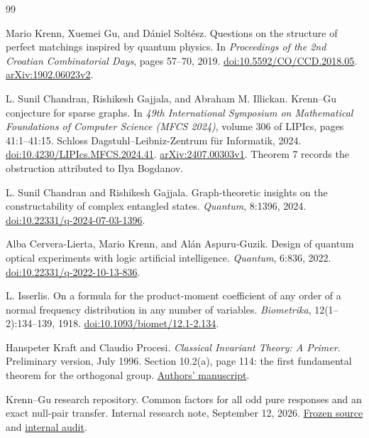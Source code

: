 \documentclass[11pt]{article}
\theoremstyle{definition}
\theoremstyle{plain}
\numberwithin{equation}{section}
\begin{document}
\begingroup
\small
\raggedright
\begin{thebibliography}{99}

Mario Krenn, Xuemei Gu, and D\'aniel Solt\'esz.
Questions on the structure of perfect matchings inspired by quantum physics.
In \emph{Proceedings of the 2nd Croatian Combinatorial Days}, pages 57--70, 2019.
\href{https://doi.org/10.5592/CO/CCD.2018.05}{doi:10.5592/CO/CCD.2018.05}.
\href{https://arxiv.org/abs/1902.06023v2}{arXiv:1902.06023v2}.

L. Sunil Chandran, Rishikesh Gajjala, and Abraham M. Illickan.
Krenn--Gu conjecture for sparse graphs.
In \emph{49th International Symposium on Mathematical Foundations of Computer
Science (MFCS 2024)}, volume 306 of LIPIcs, pages 41:1--41:15.
Schloss Dagstuhl--Leibniz-Zentrum f\"ur Informatik, 2024.
\href{https://doi.org/10.4230/LIPIcs.MFCS.2024.41}{doi:10.4230/LIPIcs.MFCS.2024.41}.
\href{https://arxiv.org/abs/2407.00303v1}{arXiv:2407.00303v1}.
Theorem 7 records the obstruction attributed to Ilya Bogdanov.

L. Sunil Chandran and Rishikesh Gajjala.
Graph-theoretic insights on the constructability of complex entangled states.
\emph{Quantum}, 8:1396, 2024.
\href{https://doi.org/10.22331/q-2024-07-03-1396}{doi:10.22331/q-2024-07-03-1396}.

Alba Cervera-Lierta, Mario Krenn, and Al\'an Aspuru-Guzik.
Design of quantum optical experiments with logic artificial intelligence.
\emph{Quantum}, 6:836, 2022.
\href{https://doi.org/10.22331/q-2022-10-13-836}{doi:10.22331/q-2022-10-13-836}.

L. Isserlis.
On a formula for the product-moment coefficient of any order of a normal
frequency distribution in any number of variables.
\emph{Biometrika}, 12(1--2):134--139, 1918.
\href{https://doi.org/10.1093/biomet/12.1-2.134}{doi:10.1093/biomet/12.1-2.134}.

Hanspeter Kraft and Claudio Procesi.
\emph{Classical Invariant Theory: A Primer}.
Preliminary version, July 1996.
Section 10.2(a), page 114: the first fundamental theorem for the orthogonal group.
\href{https://dmi.unibas.ch/fileadmin/user_upload/dmi/Personen/Kraft_Hanspeter/Classical_Invariant_Theory.pdf}{Authors' manuscript}.

Krenn--Gu research repository.
Common factors for all odd pure responses and an exact null-pair transfer.
Internal research note, September 12, 2026.
\href{https://github.com/rrajasek95/krenn-conjecture/blob/e66211d22978927f1c761997472fa9f5cf8f9421/computations/unaudited-codex-higher-common-power-bridge-2026-09-05/UNIFORM-ALL-ODD-DIAGONAL-RESPONSE-FACTORS-AND-NULL-PAIR-TRANSFER.md}{Frozen source} and
\href{https://github.com/rrajasek95/krenn-conjecture/blob/e66211d22978927f1c761997472fa9f5cf8f9421/computations/unaudited-codex-higher-common-power-bridge-2026-09-05/UNIFORM-ALL-ODD-DIAGONAL-RESPONSE-FACTORS-AND-NULL-PAIR-TRANSFER-AUDIT.md}{internal audit}.


\end{thebibliography}
\end{document}
